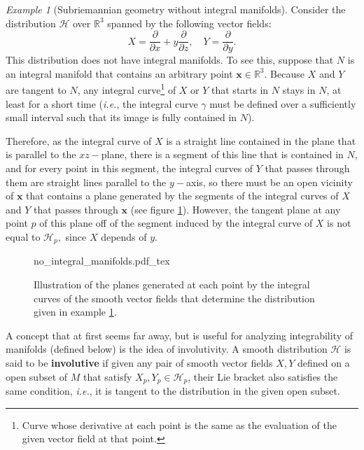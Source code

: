 \documentclass[12pt, letterpaper, reqno]{amsart}
\newcommand{\incfig}[2][1]{%
    \def\svgwidth{#1\columnwidth}
    {#2.pdf_tex}
}
\theoremstyle{definition}
\theoremstyle{plain}
\theoremstyle{remark}
\newtheorem{ex}{Example}
\begin{document}
\begin{ex}[Subriemannian geometry without integral manifolds] \label{ex:no_integral_manifolds}
	Consider the distribution $ \mathcal{H} $ over $ \mathbb{R}^3 $ spanned by the following vector fields: 
	$$ X = \frac{\partial}{\partial x} + y \frac{\partial}{\partial z}, \quad Y = \frac{\partial}{\partial y}.  $$ 
	This distribution does not have integral manifolds. To see this, suppose that $ N $ is an integral manifold that contains an arbitrary point $ \textbf{x} \in \mathbb{R}^3.  $ Because $ X $ and $ Y $ are tangent to $ N $, any integral curve\footnote{Curve whose derivative at each point is the same as the evaluation of the given vector field at that point.} of $ X $ or $ Y $ that starts in $ N $ stays in $ N $, at least for a short time (\textit{i.e.}, the integral curve $ \gamma $ must be defined over a sufficiently small interval such that its image is fully contained in $ N $).   

	Therefore, as the integral curve of $ X $ is a straight line contained in the plane that is parallel to the $ xz- $plane, there is a segment of this line that is contained in $ N $, and for every point in this segment, the integral curves of $ Y $ that passes through them are straight lines parallel to the $ y- $axis, so there must be an open vicinity of $ \textbf{x}  $ that contains a plane generated by the segments of the integral curves of $ X $ and $ Y $ that passes through $ \textbf{x}$ (see figure \ref{fig:no_integral_manifolds}). However, the tangent plane at any point $ p $  of this plane  off of the segment induced by the integral curve of $ X $ is not equal to $ \mathcal{H}_p, $ since $ X $ depends of $ y $.   
\end{ex}

\begin{figure}
    \centering
    \incfig{no_integral_manifolds}
    \caption{Illustration of the planes generated at each point by the integral curves of the smooth vector fields that determine the distribution given in example \ref{ex:no_integral_manifolds}.}
    \label{fig:no_integral_manifolds}
\end{figure}

A concept that at first seems far away, but is useful for analyzing integrability of manifolds (defined below) is the idea of involutivity. A smooth distribution $ \mathcal{H} $ is said to be \textbf{involutive} if given any pair of smooth vector fields $ X,Y $ defined on a open subset of $ M $  that satisfy $X_p,Y_p\in \mathcal{H}_p $, their Lie bracket also satisfies the same condition, \textit{i.e.}, it is tangent to the distribution in the given open subset. 
\end{document}
